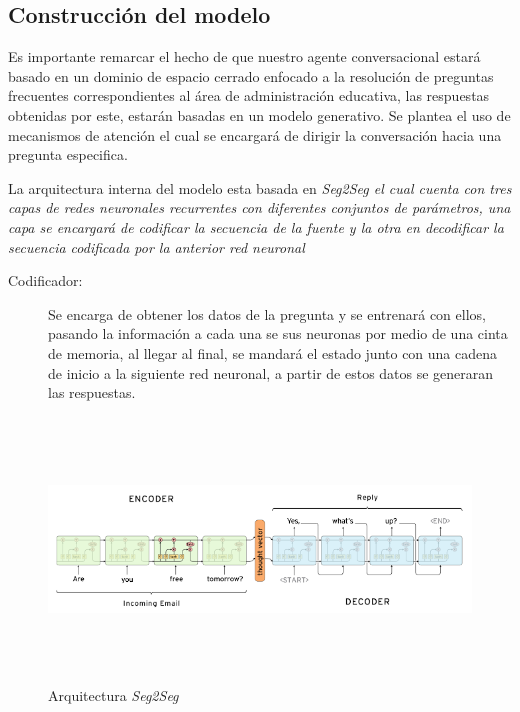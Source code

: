     \subsection{Construcción del modelo}
    
        Es importante remarcar el hecho de que nuestro agente conversacional estará basado en un dominio de espacio cerrado enfocado a la resolución de preguntas frecuentes correspondientes al área de administración educativa, las respuestas obtenidas por este, estarán basadas en un modelo generativo.
        Se plantea el uso de mecanismos de atención el cual se encargará de dirigir la conversación hacia una pregunta especifica.
        
        La arquitectura interna del modelo esta basada en \it{Seg2Seg} el cual cuenta con tres capas de redes neuronales recurrentes con diferentes conjuntos de parámetros, una capa se encargará de codificar la secuencia de la fuente y la otra en decodificar la secuencia codificada por la anterior red neuronal 
        
        \begin{description}
        \item [Codificador:] Se encarga de obtener los datos de la pregunta y se entrenará con ellos, pasando la información a cada una se sus neuronas por medio de una cinta de memoria, al llegar al final, se mandará el estado junto con una cadena de inicio a la siguiente red neuronal, a partir de estos datos se generaran las respuestas.
        \end{description}
        \begin{figure}[H]
             \centering
             \includegraphics[height=7cm, width=16.5cm]{Latex/Classes/Imagenes/seg2seg.png}
             \caption{Arquitectura \it{Seg2Seg}}
              \label{fig:infraestructuraExtraccionNLP}
        \end{figure}
        
